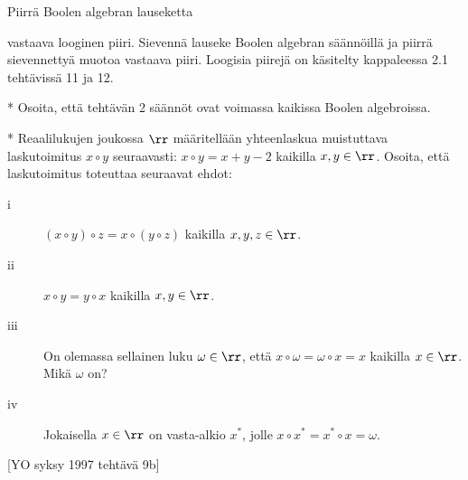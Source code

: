 \begin{tehtavasivu}
\begin{tehtava}
	Piirrä Boolen algebran lauseketta
	\begin{alakohdat}
	\end{alakohdat}
	vastaava looginen piiri. Sievennä lauseke Boolen algebran säännöillä ja piirrä sievennettyä muotoa vastaava piiri. Loogisia piirejä on käsitelty kappaleessa 2.1 tehtävissä 11 ja 12.
	\begin{vastaus}
		\begin{alakohdat}
			\alakohta{$x+(y\cdot z)$}
			\alakohta{$x$}
			\alakohta{$x+y$}
		\end{alakohdat}
	\end{vastaus}
\end{tehtava}

\begin{tehtava}
	* Osoita, että tehtävän 2 säännöt ovat voimassa kaikissa Boolen algebroissa.
\end{tehtava}

\begin{tehtava}
	* Reaalilukujen joukossa $\rr$ määritellään yhteenlaskua muistuttava laskutoimitus $x \circ y$ seuraavasti: $x \circ y = x + y - 2$ kaikilla $x, y \in \rr$. Osoita, että laskutoimitus toteuttaa seuraavat ehdot: 
	\begin{description}
	\item[i]
	$(x \circ y) \circ z = x \circ (y \circ z)$ kaikilla $x, y, z \in \rr$. 
	\item[ii]
	$x \circ y = y \circ x$ kaikilla $x, y \in \rr$. 
	\item[iii]
	On olemassa sellainen luku $\omega \in \rr$, että $x \circ \omega = \omega \circ x = x$ kaikilla $x \in \rr$. Mikä $\omega$ on? 
	\item[iv]
	Jokaisella $x \in \rr$ on vasta-alkio $x^*$, jolle $x \circ x^* = x^* \circ x = \omega$. 
	\end{description}
	[YO syksy 1997 tehtävä 9b]
\end{tehtava}

\end{tehtavasivu}

